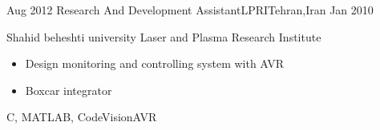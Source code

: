 \begin{experiences}
  \emptySeparator

  \experience
  {Aug 2012} {Research And Development Assistant}{LPRI}{Tehran,Iran}
  {Jan 2010} {
    Shahid beheshti university Laser and Plasma Research Institute
    \begin{itemize}
      \item Design  monitoring and controlling system with AVR
      \item Boxcar integrator
    \end{itemize}
  }
  {C, MATLAB, CodeVisionAVR}
  {}

  \emptySeparator

\end{experiences}
